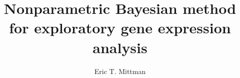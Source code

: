 \documentclass[12pt]{article}
\title{Nonparametric Bayesian method for exploratory gene expression analysis}
\author{Eric T. Mittman}
\begin{document}
\tableofcontents
\doublespacing
\maketitle



\end{document}
